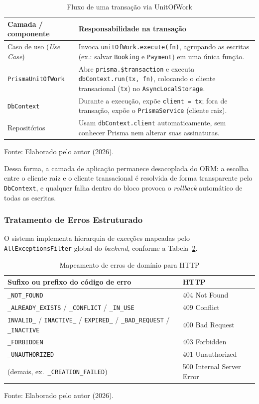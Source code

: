\documentclass[12pt,openright,oneside,a4paper]{article}
\newcommand{\fonte}[1]{{\par\vspace{0.25em}\centering\footnotesize Fonte: #1.\par}}
\begin{document}
\begin{table}[H]
\centering
\caption{Fluxo de uma transação via UnitOfWork}
\label{tab:uow}
\begin{tabularx}{\textwidth}{l X}
\toprule
\textbf{Camada / componente} & \textbf{Responsabilidade na transação} \\
\midrule
Caso de uso (\textit{Use Case}) & Invoca \texttt{unitOfWork.execute(fn)}, agrupando as escritas (ex.: salvar \texttt{Booking} e \texttt{Payment}) em uma única função. \\
\texttt{PrismaUnitOfWork} & Abre \texttt{prisma.\$transaction} e executa \texttt{dbContext.run(tx, fn)}, colocando o cliente transacional (\texttt{tx}) no \texttt{AsyncLocalStorage}. \\
\texttt{DbContext} & Durante a execução, expõe \texttt{client = tx}; fora de transação, expõe o \texttt{PrismaService} (cliente raiz). \\
Repositórios & Usam \texttt{dbContext.client} automaticamente, sem conhecer Prisma nem alterar suas assinaturas. \\
\bottomrule
\end{tabularx}
\fonte{Elaborado pelo autor (2026)}
\end{table}

Dessa forma, a camada de aplicação permanece desacoplada do ORM: a escolha entre o cliente raiz e o cliente transacional é resolvida de forma transparente pelo \texttt{DbContext}, e qualquer falha dentro do bloco provoca o \textit{rollback} automático de todas as escritas.

\subsubsection{Tratamento de Erros Estruturado}

O sistema implementa hierarquia de exceções mapeadas pelo \texttt{AllExceptionsFilter} global do \textit{backend}, conforme a Tabela~\ref{tab:error_mapping}.

\begin{table}[H]
\centering
\caption{Mapeamento de erros de domínio para HTTP}
\label{tab:error_mapping}
\begin{tabularx}{\textwidth}{>{\raggedright\arraybackslash}X l}
\toprule
\textbf{Sufixo ou prefixo do código de erro} & \textbf{HTTP} \\
\midrule
\texttt{\_NOT\_FOUND} & 404 Not Found \\
\texttt{\_ALREADY\_EXISTS} / \texttt{\_CONFLICT} / \texttt{\_IN\_USE} & 409 Conflict \\
\texttt{INVALID\_} / \texttt{INACTIVE\_} / \texttt{EXPIRED\_} / \texttt{\_BAD\_REQUEST} / \texttt{\_INACTIVE} & 400 Bad Request \\
\texttt{\_FORBIDDEN} & 403 Forbidden \\
\texttt{\_UNAUTHORIZED} & 401 Unauthorized \\
(demais, ex.\ \texttt{\_CREATION\_FAILED}) & 500 Internal Server Error \\
\bottomrule
\end{tabularx}
\fonte{Elaborado pelo autor (2026)}
\end{table}
\end{document}

